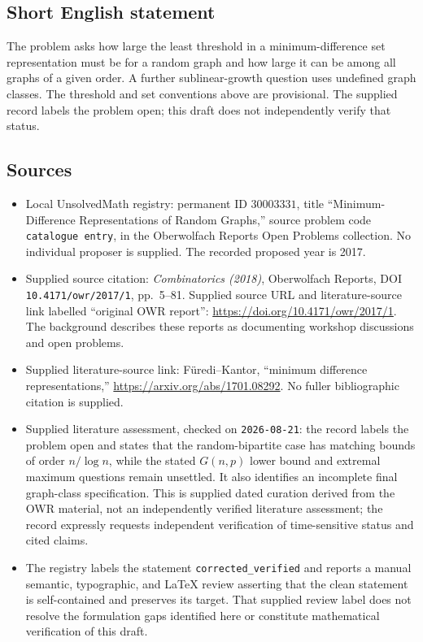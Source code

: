 \documentclass[11pt]{article}
\begin{document}
\subsection{Short English statement}
The problem asks how large the least threshold in a minimum-difference set representation must be for a random graph and how large it can be among all graphs of a given order. A further sublinear-growth question uses undefined graph classes. The threshold and set conventions above are provisional. The supplied record labels the problem open; this draft does not independently verify that status.
\subsection{Sources}
\begin{itemize}
\item Local UnsolvedMath registry: permanent ID \(30003331\), title ``Minimum-Difference Representations of Random Graphs,'' source problem code \texttt{catalogue entry}, in the Oberwolfach Reports Open Problems collection. No individual proposer is supplied. The recorded proposed year is 2017.
\item Supplied source citation: \emph{Combinatorics (2018)}, Oberwolfach Reports, DOI \texttt{10.4171/owr/2017/1}, pp.\ 5--81. Supplied source URL and literature-source link labelled ``original OWR report'': \url{https://doi.org/10.4171/owr/2017/1}. The background describes these reports as documenting workshop discussions and open problems.
\item Supplied literature-source link: F\"uredi--Kantor, ``minimum difference representations,'' \url{https://arxiv.org/abs/1701.08292}. No fuller bibliographic citation is supplied.
\item Supplied literature assessment, checked on \texttt{2026-08-21}: the record labels the problem open and states that the random-bipartite case has matching bounds of order \(n/\log n\), while the stated \(G(n,p)\) lower bound and extremal maximum questions remain unsettled. It also identifies an incomplete final graph-class specification. This is supplied dated curation derived from the OWR material, not an independently verified literature assessment; the record expressly requests independent verification of time-sensitive status and cited claims.
\item The registry labels the statement \texttt{corrected\_verified} and reports a manual semantic, typographic, and LaTeX review asserting that the clean statement is self-contained and preserves its target. That supplied review label does not resolve the formulation gaps identified here or constitute mathematical verification of this draft.
\end{itemize}
\end{document}
